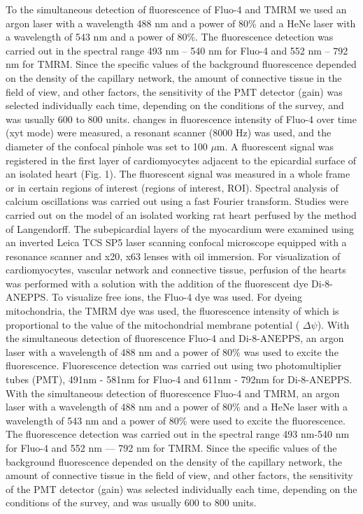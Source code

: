 \documentclass{biophys-new}
\begin{document}
To the simultaneous detection of fluorescence of Fluo-4 and TMRM we used an argon laser with a wavelength 488 nm and a power of 80\% and a HeNe laser with a wavelength of 543 nm and a power of 80\%. The fluorescence detection was carried out in the spectral range 493 nm -- 540 nm for Fluo-4 and 552 nm -- 792 nm for TMRM. Since the specific values of the background fluorescence depended on the density of the capillary network, the amount of connective tissue in the field of view, and other factors, the sensitivity of the PMT detector (gain) was selected individually each time, depending on the conditions of the survey, and was usually 600 to 800 units.
changes in fluorescence intensity of Fluo-4 over time (xyt mode) were measured, a resonant scanner (8000 Hz) was used, and the diameter of the confocal pinhole was set to 100 $\mu$m.
A fluorescent signal was registered in the first layer of cardiomyocytes adjacent to the epicardial surface of an isolated heart (Fig. 1). The fluorescent signal was measured in a whole frame or in certain regions of interest (regions of interest, ROI).
Spectral analysis of calcium oscillations was carried out using a fast Fourier transform.
Studies were carried out on the model of an isolated working rat heart perfused by the method of Langendorff.
The subepicardial layers of the myocardium were examined using an inverted Leica TCS SP5 laser scanning confocal microscope equipped with a resonance scanner and x20, x63 lenses with oil immersion.
For visualization of cardiomyocytes, vascular network and connective tissue, perfusion of the hearts was performed with a solution with the addition of the fluorescent dye Di-8-ANEPPS.
To visualize free  ions, the Fluo-4 dye was used.
For dyeing mitochondria, the TMRM dye was used, the fluorescence intensity of which is proportional to the value of the mitochondrial membrane potential ( $\Delta\psi$).
With the simultaneous detection of fluorescence Fluo-4 and Di-8-ANEPPS, an argon laser with a wavelength of 488 nm and a power of 80\% was used to excite the fluorescence.
Fluorescence detection was carried out using two photomultiplier tubes (PMT), 491nm - 581nm for Fluo-4 and 611nm - 792nm for Di-8-ANEPPS.
With the simultaneous detection of fluorescence Fluo-4 and TMRM, an argon laser with a wavelength of 488 nm and a power of 80\% and a HeNe laser with a wavelength of 543 nm and a power of 80\% were used to excite the fluorescence.
The fluorescence detection was carried out in the spectral range 493 nm-540 nm for Fluo-4 and 552 nm --- 792 nm for TMRM.
Since the specific values of the background fluorescence depended on the density of the capillary network, the amount of connective tissue in the field of view, and other factors, the sensitivity of the PMT detector (gain) was selected individually each time, depending on the conditions of the survey, and was usually 600 to 800 units.
\end{document}

